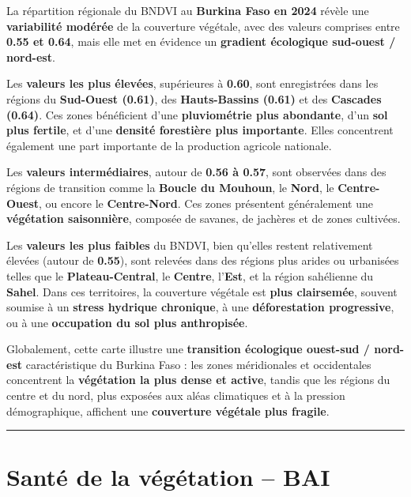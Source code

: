\documentclass[
]{book}
\begin{document}
La répartition régionale du BNDVI au \textbf{Burkina Faso en 2024} révèle une \textbf{variabilité modérée} de la couverture végétale, avec des valeurs comprises entre \textbf{0.55 et 0.64}, mais elle met en évidence un \textbf{gradient écologique sud-ouest / nord-est}.

Les \textbf{valeurs les plus élevées}, supérieures à \textbf{0.60}, sont enregistrées dans les régions du \textbf{Sud-Ouest (0.61)}, des \textbf{Hauts-Bassins (0.61)} et des \textbf{Cascades (0.64)}. Ces zones bénéficient d'une \textbf{pluviométrie plus abondante}, d'un \textbf{sol plus fertile}, et d'une \textbf{densité forestière plus importante}. Elles concentrent également une part importante de la production agricole nationale.

Les \textbf{valeurs intermédiaires}, autour de \textbf{0.56 à 0.57}, sont observées dans des régions de transition comme la \textbf{Boucle du Mouhoun}, le \textbf{Nord}, le \textbf{Centre-Ouest}, ou encore le \textbf{Centre-Nord}. Ces zones présentent généralement une \textbf{végétation saisonnière}, composée de savanes, de jachères et de zones cultivées.

Les \textbf{valeurs les plus faibles} du BNDVI, bien qu'elles restent relativement élevées (autour de \textbf{0.55}), sont relevées dans des régions plus arides ou urbanisées telles que le \textbf{Plateau-Central}, le \textbf{Centre}, l'\textbf{Est}, et la région sahélienne du \textbf{Sahel}. Dans ces territoires, la couverture végétale est \textbf{plus clairsemée}, souvent soumise à un \textbf{stress hydrique chronique}, à une \textbf{déforestation progressive}, ou à une \textbf{occupation du sol plus anthropisée}.

Globalement, cette carte illustre une \textbf{transition écologique ouest-sud / nord-est} caractéristique du Burkina Faso : les zones méridionales et occidentales concentrent la \textbf{végétation la plus dense et active}, tandis que les régions du centre et du nord, plus exposées aux aléas climatiques et à la pression démographique, affichent une \textbf{couverture végétale plus fragile}.

\begin{center}\rule{0.5\linewidth}{0.5pt}\end{center}

\section{Santé de la végétation -- BAI}\label{santuxe9-de-la-vuxe9guxe9tation-bai}
\end{document}
